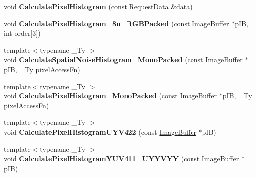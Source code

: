 \begin{DoxyCompactItemize}
\item 
\hypertarget{class_histogram_canvas_a25bcb799e163bcef889927c3b1180df5}{void {\bfseries Calculate\+Pixel\+Histogram} (const \hyperlink{struct_request_data}{Request\+Data} \&data)}\label{class_histogram_canvas_a25bcb799e163bcef889927c3b1180df5}

\item 
\hypertarget{class_histogram_canvas_a9b423e1220642f9effaee9dd3bce0608}{void {\bfseries Calculate\+Pixel\+Histogram\+\_\+8u\+\_\+\+R\+G\+B\+Packed} (const \hyperlink{struct_image_buffer}{Image\+Buffer} $\ast$p\+I\+B, int order\mbox{[}3\mbox{]})}\label{class_histogram_canvas_a9b423e1220642f9effaee9dd3bce0608}

\item 
\hypertarget{class_histogram_canvas_ad0433782d28f6f60ca7b46b53e70dd31}{{\footnotesize template$<$typename \+\_\+\+Ty $>$ }\\void {\bfseries Calculate\+Spatial\+Noise\+Histogram\+\_\+\+Mono\+Packed} (const \hyperlink{struct_image_buffer}{Image\+Buffer} $\ast$p\+I\+B, \+\_\+\+Ty pixel\+Access\+Fn)}\label{class_histogram_canvas_ad0433782d28f6f60ca7b46b53e70dd31}

\item 
\hypertarget{class_histogram_canvas_a6e1813492042a8d038b64dc3ef715523}{{\footnotesize template$<$typename \+\_\+\+Ty $>$ }\\void {\bfseries Calculate\+Pixel\+Histogram\+\_\+\+Mono\+Packed} (const \hyperlink{struct_image_buffer}{Image\+Buffer} $\ast$p\+I\+B, \+\_\+\+Ty pixel\+Access\+Fn)}\label{class_histogram_canvas_a6e1813492042a8d038b64dc3ef715523}

\item 
\hypertarget{class_histogram_canvas_a41518f6ef92e33a0975d79094d800a29}{{\footnotesize template$<$typename \+\_\+\+Ty $>$ }\\void {\bfseries Calculate\+Pixel\+Histogram\+U\+Y\+V422} (const \hyperlink{struct_image_buffer}{Image\+Buffer} $\ast$p\+I\+B)}\label{class_histogram_canvas_a41518f6ef92e33a0975d79094d800a29}

\item 
\hypertarget{class_histogram_canvas_a558adcb945bbe08a4c4b13632ad6d34b}{{\footnotesize template$<$typename \+\_\+\+Ty $>$ }\\void {\bfseries Calculate\+Pixel\+Histogram\+Y\+U\+V411\+\_\+\+U\+Y\+Y\+V\+Y\+Y} (const \hyperlink{struct_image_buffer}{Image\+Buffer} $\ast$p\+I\+B)}\label{class_histogram_canvas_a558adcb945bbe08a4c4b13632ad6d34b}


\end{DoxyCompactItemize}
